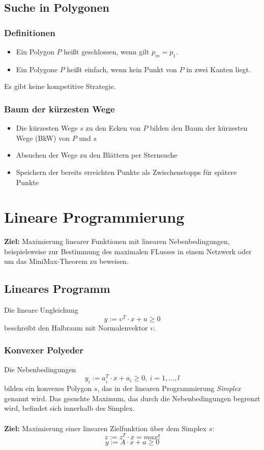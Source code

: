 \subsection{Suche in Polygonen}

\subsubsection{Definitionen}
\begin{itemize}
	\item Ein Polygon \(P\) heißt geschlossen, wenn gilt \(p_m = p_1\).
	\item Ein Polygone \(P\) heißt einfach, wenn kein Punkt von \(P\) in zwei Kanten liegt.
\end{itemize}
Es gibt keine kompetitive Strategie.

\subsubsection{Baum der kürzesten Wege}
\begin{itemize}
	\item Die kürzesten Wege \(s\) zu den Ecken von \(P\) bilden den Baum der kürzesten Wege (BkW) von \(P\) und \(s\)
	\item Absuchen der Wege zu den Blättern per Sternsuche
	\item Speichern der bereits erreichten Punkte als Zwischenstopps für spätere Punkte
\end{itemize}



\section{Lineare Programmierung}
\textbf{Ziel:} Maximierung linearer Funktionen mit linearen Nebenbedingungen, beispielsweise zur Bestimmung des maximalen FLusses in einem Netzwerk oder um das MiniMax-Theorem zu beweisen.

\subsection{Lineares Programm}
Die lineare Ungleichung
\[y := \upsilon^T \cdot x + u \geq 0\]
beschreibt den Halbraum mit Normalenvektor \(\upsilon\).

\subsubsection{Konvexer Polyeder}
Die Nebenbedingungen
\[y_i := a_i^T \cdot x + a_i \geq 0,~i = 1,...,l\]
bilden ein konvexes Polygon \(s\), das in der linearen Programmierung \textit{Simplex} genannt wird. Das gesuchte Maximum, das durch die Nebenbedingungen begrenzt wird, befindet sich innerhalb des Simplex.
\\\\
\textbf{Ziel:} Maximierung einer linearen Zielfunktion über dem Simplex \(s\):
\[z := z^T \cdot x = max!\]
\[y := A\cdot x + a \geq 0\]

